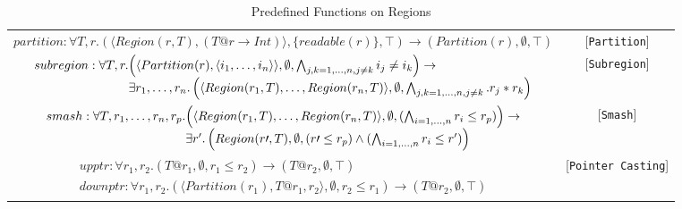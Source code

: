 \documentclass{article}
\newcommand{\rtriple}[3]{\left({#1},{#2},{#3}\right)}
\newcommand{\rsingle}[1]{\rtriple{#1}{\emptyset}{\top}}
\begin{document}
\begin{table*}
\centering
{\small
\begin{tabular}{cc}

%
%
\begin{math}
partition : \forall T,r. \rtriple{\langle Region(r,T), (T@r \rightarrow \mathit{Int}) \rangle}{\{readable(r)\}}{\top} \rightarrow \rsingle{Partition(r)}
\end{math} & [{\tt Partition}] \\

%
%
\begin{math}
\begin{array}{lc}
\begin{array}{l@{}l}
subregion : \forall T,r. & \rtriple{\langle Partition(r), \langle i_1, \ldots, i_n \rangle \rangle}{\emptyset}{\bigwedge_{j,k = 1, \ldots, n, j \ne k} i_j \ne i_k}
\rightarrow \\
& \exists r_1, \ldots, r_n. \rtriple{\langle Region(r_1,T), \ldots, Region(r_n,T) \rangle}{\emptyset}{\bigwedge_{j,k = 1, \ldots, n, j \ne k}. r_j * r_k}
\end{array}
\end{array}
\end{math} & [{\tt Subregion}] \\

%
%
\begin{math}
\begin{array}{l@{}l}
smash : \forall T,r_1,\ldots,r_n,r_p. & \rtriple{\langle Region(r_1,T), \ldots, Region(r_n,T) \rangle}{\emptyset}{(\bigwedge_{i = 1, \ldots, n} r_i \le r_p)} \rightarrow \\
& \exists r'.  \rtriple{Region(r\prime,T)}{\emptyset}{(r\prime \le r_p) \wedge (\bigwedge_{i = 1, \ldots, n} r_i \le r')}
\end{array}
\end{math} & [{\tt Smash}] \\

%
%
\begin{math}
\begin{array}{l}
upptr : \forall r_1, r_2. \rtriple{T@r_1}{\emptyset}{r_1 \le r_2} \rightarrow \rsingle{T@r_2} \\
downptr : \forall r_1, r_2. \rtriple{\langle Partition(r_1), T@r_1, r_2 \rangle}{\emptyset}{r_2 \le r_1} \rightarrow \rsingle{T@r_2}
\end{array}
\end{math} & [{\tt Pointer Casting}]

\end{tabular}
}
\caption{Predefined Functions on Regions}
\end{table*}
\end{document}

